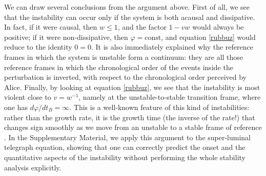 \documentclass[a4paper, amsfonts, amssymb, amsmath, reprint, showkeys,  twoside, onecolumn,notitlepage,nofootinbib]{revtex4-1}
\theoremstyle{definition}
\theoremstyle{theorem}
\begin{document}
We can draw several conclusions from the argument above. First of all, we see that the instability can occur only if the system is both acausal and dissipative. In fact, if it were causal, then $w \leq 1$, and the factor $1-vw$ would always be positive; if it were non-dissipative, then $\varphi=\text{const}$, and equation \eqref{rubbuz} would reduce to the identity $0=0$. It is also immediately explained why the reference frames in which the system is unstable form a continuum: they are all those reference frames in which the chronological order of the events inside the perturbation is inverted, with respect to the chronological order perceived by Alice. Finally, by looking at equation \eqref{rubbuz}, we see that the instability is most violent close to $v=w^{-1}$, namely at the unstable-to-stable transition frame, where one has $d\varphi /dt_B = \infty$. This is a well-known feature of this kind of instabilities: rather than the growth rate, it is the growth time (the inverse of the rate!) that changes sign smoothly as we move from an unstable to a stable frame of reference \cite{Hiscock_Insatibility_first_order,GavassinoLyapunov_2020,GavassinoUEIT2021}.
In the Supplementary Material, we apply this argument to the super-luminal telegraph equation, showing that one can correctly predict the onset and the quantitative aspects of the instability without performing the whole stability analysis explicitly.
\end{document}
